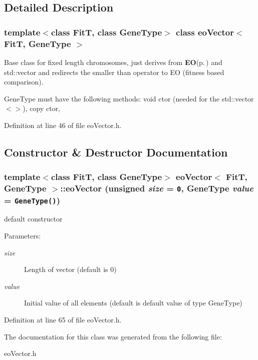 \subsection{Detailed Description}
\subsubsection*{template$<$class Fit\-T, class Gene\-Type$>$ class eo\-Vector$<$ Fit\-T, Gene\-Type $>$}

Base class for fixed length chromosomes, just derives from {\bf EO}{\rm (p.\,\pageref{class_e_o})} and std::vector and redirects the smaller than operator to EO (fitness based comparison). 

Gene\-Type must have the following methods: void ctor (needed for the std::vector$<$$>$), copy ctor, 



Definition at line 46 of file eo\-Vector.h.

\subsection{Constructor \& Destructor Documentation}
\subsubsection{\setlength{\rightskip}{0pt plus 5cm}template$<$class Fit\-T, class Gene\-Type$>$ {\bf eo\-Vector}$<$ {\bf Fit\-T}, Gene\-Type $>$::{\bf eo\-Vector} (unsigned {\em size} = {\tt 0}, Gene\-Type {\em value} = {\tt GeneType()})\hspace{0.3cm}{\tt  [inline]}}\label{classeo_vector_a0}


default constructor 

\begin{Desc}
\item[Parameters:]
\begin{description}
\item[{\em size}]Length of vector (default is 0) \item[{\em value}]Initial value of all elements (default is default value of type Gene\-Type) \end{description}
\end{Desc}


Definition at line 65 of file eo\-Vector.h.

The documentation for this class was generated from the following file:\begin{CompactItemize}
\item 
eo\-Vector.h\end{CompactItemize}
